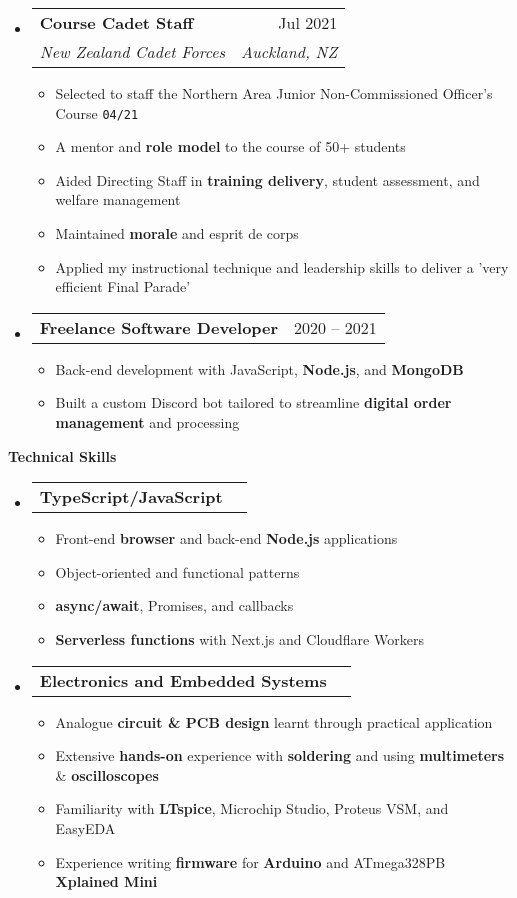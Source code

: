 \documentclass[11pt,a4paper]{article}[leftmargin=*]
\makeatletter
\def \entryspacing {-0pt}
\def \bulletstylei {\faAngleRight\hspace{-4.5pt}}
\renewcommand{\section}[2]{\vspace{5pt}
  \colorbox{secondary}{\color{white}\raggedbottom\normalsize\textbf{{#1}{\hspace{2pt}#2\hspace{4pt}}}}
}
\newcommand{\resumeEntryStart}{\begin{itemize}[leftmargin=2.5mm]}
\newcommand{\resumeEntryEnd}{\end{itemize}\vspace{\entryspacing}}
\newcommand{\resumeItemListStart}{\begin{itemize}[leftmargin=4.5mm]}
\newcommand{\resumeItemListEnd}{\end{itemize}}
\newcommand{\resumeItem}[2][\bulletstylei]{
  \item[\small#1]\small{
    {#2 \vspace{-2pt}}
  }
}
\newcommand{\resumeEntryTSDL}[4]{
  \vspace{-1pt}\item[]
    \begin{tabularx}{0.97\textwidth}{X@{\hspace{60pt}}r}
      \textbf{\color{primary}#1} & {\firabook\color{accent}\small#2} \\
      \textit{\color{accent}\small#3} & \textit{\color{accent}\small#4} \\
    \end{tabularx}\vspace{-6pt}
}
\newcommand{\resumeEntryTD}[2]{
  \vspace{-1pt}\item[]
    \begin{tabularx}{0.97\textwidth}{X@{\hspace{60pt}}r}
      \textbf{\color{primary}#1} & {\firabook\color{accent}\small#2} \\
    \end{tabularx}\vspace{-6pt}
}
\newcommand{\resumeBf}[1]{\small\textbf{\color{halfbold}#1}}
\makeatother
\begin{document}
\resumeEntryStart
\resumeEntryTSDL
{Course Cadet Staff}{Jul 2021}
{New Zealand Cadet Forces}{Auckland, NZ}

\resumeItemListStart
\resumeItem {Selected to staff the Northern Area Junior Non-Commissioned Officer's Course \texttt{04/21}}
\resumeItem {A mentor and \resumeBf{role model} to the course of 50+ students}
\resumeItem {Aided Directing Staff in \resumeBf{training delivery}, student assessment, and welfare management}
\resumeItem {Maintained \resumeBf{morale} and esprit de corps}
\resumeItem {Applied my instructional technique and leadership skills to deliver a 'very efficient Final Parade'}
\resumeItemListEnd
\resumeEntryEnd

\vspace*{-0.5\baselineskip}

\resumeEntryStart
\resumeEntryTD
{Freelance Software Developer}{2020 -- 2021}
\resumeItemListStart
\resumeItem {Back-end development with JavaScript, \resumeBf{Node.js}, and \resumeBf{MongoDB}}
\resumeItem {Built a custom Discord bot tailored to streamline \resumeBf{digital order management} and processing}
\resumeItemListEnd
\resumeEntryEnd


\section{\faCogs}{Technical Skills}

\resumeEntryStart
\resumeEntryTD
{TypeScript/JavaScript}{}
\resumeItemListStart
\resumeItem {Front-end \resumeBf{browser} and back-end \resumeBf{Node.js} applications}
\resumeItem {Object-oriented and functional patterns}
\resumeItem {\resumeBf{async/await}, Promises, and callbacks}
\resumeItem {\resumeBf{Serverless functions} with Next.js and Cloudflare Workers}
\resumeItemListEnd
\resumeEntryEnd

\vspace*{-0.5\baselineskip}

\resumeEntryStart
\resumeEntryTD
{Electronics and Embedded Systems}{}
\resumeItemListStart
\resumeItem {Analogue \resumeBf{circuit \& PCB design} learnt through practical application}
\resumeItem {Extensive \resumeBf{hands-on} experience with \resumeBf{soldering} and using \resumeBf{multimeters} \& \resumeBf{oscilloscopes}}
\resumeItem {Familiarity with \resumeBf{LTspice}, Microchip Studio, Proteus VSM, and EasyEDA}
\resumeItem {Experience writing \resumeBf{firmware} for \resumeBf{Arduino} and ATmega328PB \resumeBf{Xplained Mini}}
\resumeItemListEnd
\resumeEntryEnd
\end{document}
